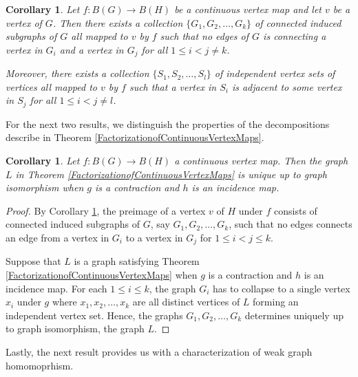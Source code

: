 \documentclass{amsart}
\newtheorem{corollary}[theorem]{Corollary}
\theoremstyle{definition}
\theoremstyle{remark}
\numberwithin{equation}{section}
\begin{document}
	\begin{corollary}
		\label{ContinuousVertexMapsPreimage}
		Let \(f: B(G) \rightarrow B(H)\) be a continuous vertex map and let \(v\) be a vertex of \(G\). Then there exists a collection \(\{G_1,G_2,\ldots,G_k\}\) of connected induced subgraphs of \(G\) all mapped to \(v\) by \(f\) such that no edges of \(G\) is connecting a vertex in \(G_i\) and a vertex in \(G_j\) for all \(1 \leq i < j \neq k\).
		
		Moreover, there exists a collection \(\{S_1,S_2,\ldots,S_l\}\) of independent vertex sets of vertices all mapped to \(v\) by \(f\) such that a vertex in \(S_i\) is adjacent to some vertex in \(S_j\) for all \(1 \leq i < j \neq l\).
		
	\end{corollary}
	
	For the next two results, we distinguish the properties of the decompositions describe in Theorem \ref{FactorizationofContinuousVertexMaps}.
	
	\begin{corollary}
		Let \(f: B(G) \rightarrow B(H)\) a continuous vertex map. Then the graph \(L\) in Theorem \ref{FactorizationofContinuousVertexMaps} is unique up to graph isomorphism when \(g\) is a contraction and \(h\) is an incidence map. 
	\end{corollary}
	\begin{proof}
		By Corollary \ref{ContinuousVertexMapsPreimage}, the preimage of a vertex \(v\) of \(H\) under \(f\) consists of connected induced subgraphs of \(G\), say \(G_1,G_2, \ldots, G_k\), such that no edges connects an edge from a vertex in \(G_i\) to a vertex in \(G_j\) for \(1 \leq i<j \leq k\).
		
		Suppose that \(L\) is a graph satisfying Theorem \ref{FactorizationofContinuousVertexMaps} when \(g\) is a contraction and \(h\) is an incidence map. For each \(1 \leq i \leq k\), the graph \(G_i\) has to collapse to a single vertex \(x_i\) under \(g\) where \(x_1,x_2,\ldots, x_k\) are all distinct vertices of \(L\) forming an independent vertex set. Hence, the graphs \(G_1,G_2, \ldots, G_k\) determines uniquely up to graph isomorphism, the graph \(L\).
	\end{proof}
	
	Lastly, the next result provides us with a characterization of weak graph homomoprhism.
	
\end{document}
